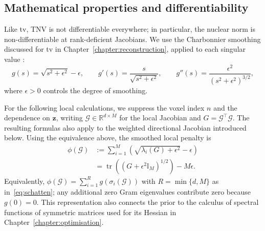 \subsection{Mathematical properties and differentiability}
\label{subsec:tnv_differentiability}

Like \gls{tv}, TNV is not differentiable everywhere; in particular, the nuclear norm is non-differentiable at rank-deficient Jacobians. We use the Charbonnier smoothing discussed for \gls{tv} in Chapter~\ref{chapter:reconstruction}, applied to each singular value \cite{charbonnier_deterministic_1997,fessler_image_2017}:
\begin{equation}\label{eq:charbonnier_g}
g(s)=\sqrt{s^2+\epsilon^2}-\epsilon,
\qquad
g'(s)=\frac{s}{\sqrt{s^2+\epsilon^2}},
\qquad
g''(s)=\frac{\epsilon^2}{(s^2+\epsilon^2)^{3/2}},
\end{equation}
where $\epsilon>0$ controls the degree of smoothing.

For the following local calculations, we suppress the voxel index $n$ and the dependence on $\bm{z}$, writing $\mathcal{G}\in\mathbb{R}^{d\times M}$ for the local Jacobian and $G=\mathcal{G}^\top\mathcal{G}$. The resulting formulas also apply to the weighted directional Jacobian introduced below. Using the equivalence above, the smoothed local penalty is
\begin{equation}
    \begin{aligned}
        \phi(\mathcal{G})
        &:=\sum_{i=1}^{M}\left(\sqrt{\lambda_i(G)+\epsilon^2}-\epsilon\right)\\
        &=\operatorname{tr}\!\left((G+\epsilon^2\mathbb{I}_M)^{1/2}\right)-M\epsilon.
    \end{aligned}
    \label{eq:phi_gram_spectral}
\end{equation}
Equivalently, $\phi(\mathcal{G})=\sum_{i=1}^{R}g(\sigma_i(\mathcal{G}))$ with $R=\min\{d,M\}$ as in~\eqref{eq:schatten}; any additional zero Gram eigenvalues contribute zero because $g(0)=0$. This representation also connects the prior to the calculus of spectral functions of symmetric matrices used for its Hessian in Chapter~\ref{chapter:optimisation}.

